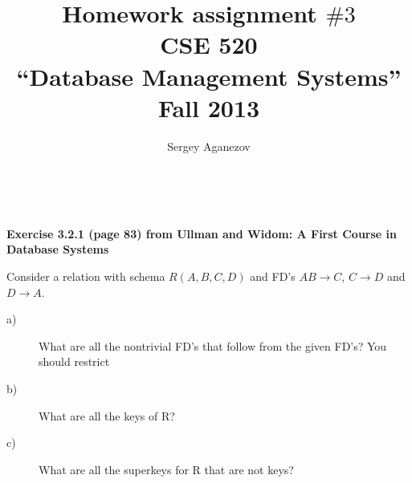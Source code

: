 \documentclass[a4paper]{article}
\author{Sergey Aganezov}
\title{Homework assignment $\#3$ \\ CSE 520 \\ ``Database Management Systems'' \\ Fall 2013}
\date\
\newcommand{\ra}{\rightarrow}
\newenvironment{problem}[1][\unskip]%
{\centering\textbf{ #1}%

\vspace{0.5cm}
\begin{em}}%
{\end{em}}
\begin{document}
	\maketitle
	\newpage
	\begin{problem}[Exercise 3.2.1 (page 83) from Ullman and Widom: A First Course in Database Systems]

		Consider a relation with schema $R(A,B,C,D)$ and FD's $AB \ra C$, $C \ra D$ and $D \ra A$.
		\begin{description}
		\item[a)] What are all the nontrivial FD's that follow from the given FD's? You should restrict
		\item[b)] What are all the keys of R?
		\item[c)] What are all the superkeys for R that are not keys?
		\end{description}
	\end{problem}
\end{document}
